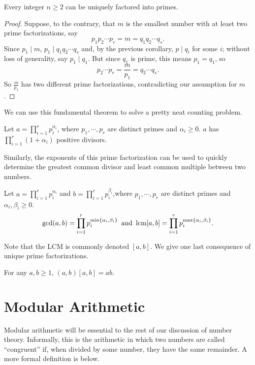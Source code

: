 \documentclass[../m055main.tex]{subfiles}
\begin{document}
\begin{theorem}
    Every integer $n \geq 2$ can be uniquely factored into primes.
\end{theorem}

\begin{proof}
    Suppose, to the contrary, that $m$ is the smallest number with at least two prime factorizations, say
    \[ p_1 p_2 \cdots p_r = m = q_1 q_2 \cdots q_s. \]
    Since $p_1 \mid m$, $p_1 \mid q_1 q_2 \cdots q_s$ and, by the previous corollary, $p \mid q_i$ for some $i$; without loss of generality, say $p_1 \mid q_1$.
    But since $q_1$ is prime, this means $p_1 = q_1$, so
    \[ p_2 \cdots p_r = \frac{m}{p_1} = q_2 \cdots q_s. \]
    So $\frac{m}{p_1}$ has two different prime factorizations, contradicting our assumption for $m$.
\end{proof}

We can use this fundamental theorem to solve a pretty neat counting problem.

\begin{theorem}
    Let $a = \prod\limits_{i=1}^r p_i^{\alpha_i}$, where $p_1, \cdots, p_r$ are distinct primes and $\alpha_i \geq 0$.
    $a$ has $\prod\limits_{i=1}^{r}(1 + \alpha_i)$ positive divisors.
\end{theorem}

Similarly, the exponents of this prime factorization can be used to quickly determine the greatest common divisor and least common multiple between two numbers.

\begin{theorem}
    Let $a = \prod\limits_{i=1}^r p_i^{\alpha_i}$ and $b = \prod\limits_{i=1}^r p_i^{\beta_i}$,where $p_1, \cdots, p_r$ are distinct primes and $\alpha_i, \beta_i \geq 0$.
    \[ \gcd (a,b) = \prod_{i=1}^r p_i^{\min \left\{ \alpha_i, \beta_i \right\}} \,\text{ and }\, \textrm{lcm} [a,b] = \prod_{i=1}^r p_i^{\max \left\{ \alpha_i, \beta_i \right\}}. \]
\end{theorem}

Note that the LCM is commonly denoted $[a,b]$.
We give one last consequence of unique prime factorizations.

\begin{theorem}
    For any $a,b \geq 1$, $(a,b) [a,b] = ab$.
\end{theorem}

\section{Modular Arithmetic}
Modular arithmetic will be essential to the rest of our discussion of number theory.
Informally, this is the arithmetic in which two numbers are called ``congruent'' if, when divided by some number, they have the same remainder.
A more formal definition is below.
\end{document}
